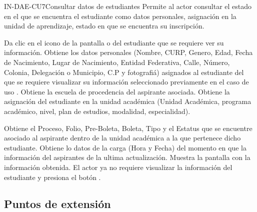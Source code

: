 \begin{UseCase}{IN-DAE-CU7}{Consultar datos de estudiantes}{
	Permite al actor consultar el estado en el que se encuentra el estudiante como datos personales, asignación en la unidad de aprendizaje, estado en que se encuentra su inscripción. 	
}
\end{UseCase}

\begin{UCtrayectoria}
	\UCpaso [\UCactor] Da clic en el icono \IUVer de la pantalla  o  del estudiante que se requiere ver su información.
	\UCpaso Obtiene los datos personales (Nombre, CURP, Genero, Edad, Fecha de Nacimiento, Lugar de Nacimiento, Entidad Federativa, Calle, Número, Colonia, Delegación o Municipio, C.P y fotografiá) asignados al estudiante del que se requiere visualizar su información seleccionado previamente en el caso de uso .
	\UCpaso Obtiene la escuela de procedencia del aspirante asociada.
	\UCpaso Obtiene la asignación del estudiante en la unidad académica (Unidad Académica, programa académico, nivel, plan de estudios, modalidad, especialidad). 
	
	\UCpaso Obtiene el Proceso, Folio, Pre-Boleta, Boleta, Tipo y el Estatus que se encuentre asociado al aspirante dentro de la unidad académica a la que pertenece dicho estudiante.  
	\UCpaso Obtiene lo datos de la carga (Hora y Fecha) del momento en que la información del aspirantes de la ultima actualización. 
	\UCpaso \label{IN-DAE-CU7:recarga} Muestra la pantalla  con la información obtenida.
	\UCpaso [\UCactor] El actor ya no requiere visualizar la información del estudiante y presiona el botón .
\end{UCtrayectoria}

\subsection{Puntos de extensión}


